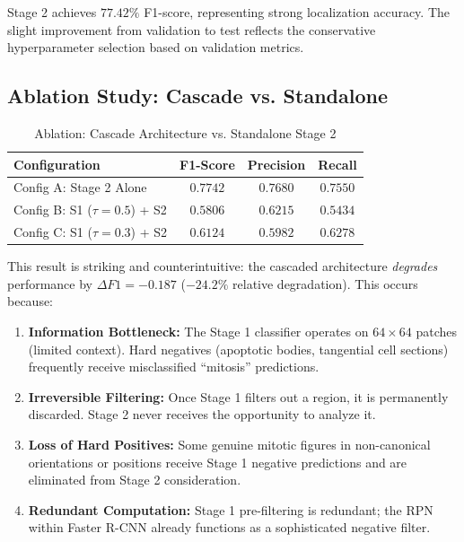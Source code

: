\documentclass[journal]{IEEEtran}
\begin{document}
Stage 2 achieves $77.42\%$ F1-score, representing strong localization accuracy. The slight improvement from validation to test reflects the conservative hyperparameter selection based on validation metrics.

\subsection{Ablation Study: Cascade vs. Standalone}
\begin{table}[!h]
\centering
\begin{tabular}{|l|c|c|c|}
\hline
\textbf{Configuration} & \textbf{F1-Score} & \textbf{Precision} & \textbf{Recall} \\
\hline
Config A: Stage 2 Alone & $\mathbf{0.7742}$ & $\mathbf{0.7680}$ & $\mathbf{0.7550}$ \\
Config B: S1 ($\tau=0.5$) + S2 & $0.5806$ & $0.6215$ & $0.5434$ \\
Config C: S1 ($\tau=0.3$) + S2 & $0.6124$ & $0.5982$ & $0.6278$ \\
\hline
\end{tabular}
\caption{Ablation: Cascade Architecture vs. Standalone Stage 2}
\label{table:ablation_cascade}
\end{table}

This result is striking and counterintuitive: the cascaded architecture \textit{degrades} performance by $\Delta F1 = -0.187$ ($-24.2\%$ relative degradation). This occurs because:

\begin{enumerate}
\item \textbf{Information Bottleneck:} The Stage 1 classifier operates on $64 \times 64$ patches (limited context). Hard negatives (apoptotic bodies, tangential cell sections) frequently receive misclassified ``mitosis'' predictions.
\item \textbf{Irreversible Filtering:} Once Stage 1 filters out a region, it is permanently discarded. Stage 2 never receives the opportunity to analyze it.
\item \textbf{Loss of Hard Positives:} Some genuine mitotic figures in non-canonical orientations or positions receive Stage 1 negative predictions and are eliminated from Stage 2 consideration.
\item \textbf{Redundant Computation:} Stage 1 pre-filtering is redundant; the RPN within Faster R-CNN already functions as a sophisticated negative filter.
\end{enumerate}
\end{document}
